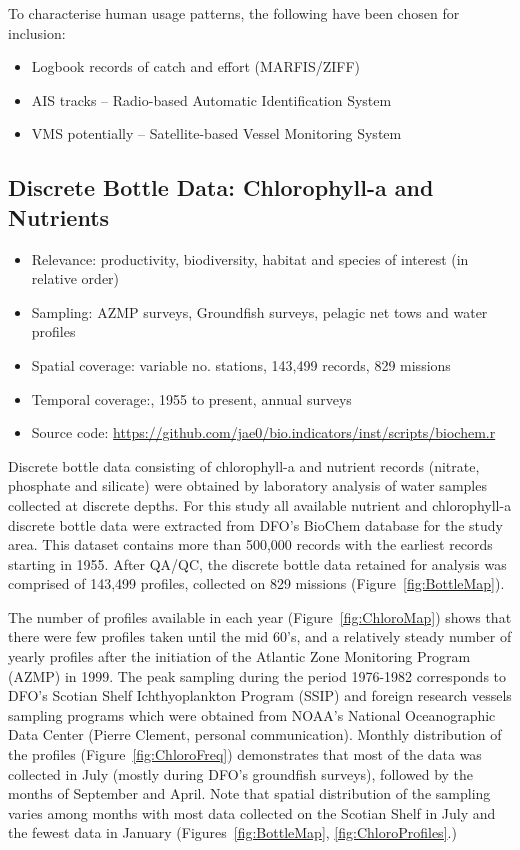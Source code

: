 \documentclass[letterpaper,portrait,11pt]{scrartcl}
\numberwithin{equation}{section}		%
\numberwithin{figure}{section}		%
\numberwithin{table}{section}				%
\begin{document}
To characterise human usage patterns, the following have been chosen for inclusion:

\begin{itemize}
	\item Logbook records of catch and effort (MARFIS/ZIFF)
  \item AIS tracks -- Radio-based Automatic Identification System
  \item VMS potentially -- Satellite-based Vessel Monitoring System
\end{itemize}

\subsection{Discrete Bottle Data: Chlorophyll-a and Nutrients}

\begin{itemize}
  \item Relevance: productivity, biodiversity, habitat and species of interest (in relative order)
  \item Sampling: AZMP surveys, Groundfish surveys, pelagic net tows and water profiles
  \item Spatial coverage: variable no. stations, 143,499 records, 829 missions
  \item Temporal coverage:,  1955 to present, annual surveys
  \item Source code: \url{https://github.com/jae0/bio.indicators/inst/scripts/biochem.r}
\end{itemize}

Discrete bottle data consisting of chlorophyll-a and nutrient records (nitrate, phosphate and silicate) were obtained by laboratory analysis of water samples collected at discrete depths. For this study all available nutrient and chlorophyll-a discrete bottle data were extracted from DFO's BioChem database for the study area. This dataset contains more than 500,000 records with the earliest records starting in 1955. After QA/QC, the discrete bottle data retained for analysis was comprised of 143,499 profiles, collected on 829 missions (Figure~\ref{fig:BottleMap}).

The number of profiles available in each year (Figure~\ref{fig:ChloroMap}) shows that there were few profiles taken until the mid 60's, and a relatively steady number of yearly profiles after the initiation of the Atlantic Zone Monitoring Program (AZMP) in 1999. The peak sampling during the period 1976-1982 corresponds to DFO's Scotian Shelf Ichthyoplankton Program (SSIP) and foreign research vessels sampling programs which were obtained from NOAA's National Oceanographic Data Center (Pierre Clement, personal communication).  Monthly distribution of the profiles (Figure~\ref{fig:ChloroFreq})  demonstrates that most of the data was collected in July (mostly during DFO's groundfish surveys), followed by the months of September and April. Note that spatial distribution of the sampling varies among months with most data collected on the Scotian Shelf in July and the fewest data in January (Figures~\ref{fig:BottleMap}, \ref{fig:ChloroProfiles}.)
\end{document}
